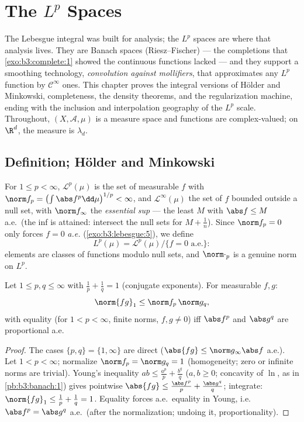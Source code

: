 \chapter{The \texorpdfstring{$L^p$}{Lp} Spaces}\label{ch:b3:lp}

The Lebesgue integral was built for analysis; the $L^p$ spaces
are where that analysis lives. They are Banach spaces
(Riesz--Fischer) --- the completions that
\cref{exo:b3:complete:1} showed the continuous functions
lacked --- and they support a smoothing technology,
\emph{convolution against mollifiers}, that approximates any
$L^p$ function by $\mathcal C^\infty$ ones. This chapter proves
the integral versions of H\"older and Minkowski, completeness,
the density theorems, and the regularization machine, ending
with the inclusion and interpolation geography of the $L^p$
scale. Throughout, $(X, \mathcal A, \mu)$ is a measure space
and functions are complex-valued; on $\R^d$, the measure is
$\lambda_d$.

\section{Definition; H\"older and Minkowski}

\begin{definition}\label{def:b3:lp:space}
For $1 \leq p < \infty$, $\mathcal L^p(\mu)$ is the set of
measurable $f$ with $\norm f_p = \bigl(\int\abs
f^p\dd\mu\bigr)^{1/p} < \infty$, and $\mathcal L^\infty(\mu)$
the set of $f$ bounded outside a null set, with $\norm
f_\infty$ the \emph{essential sup} --- the least $M$ with
$\abs f \leq M$ a.e.\ (the inf is attained: intersect the null
sets for $M + \frac1n$). Since $\norm f_p = 0$ only forces $f
= 0$ \emph{a.e.} (\cref{exo:b3:lebesgue:5}), we define
\[
L^p(\mu) = \mathcal L^p(\mu)/\{f = 0 \text{ a.e.}\} :
\]
elements are classes of functions modulo null sets, and
$\norm\cdot_p$ is a genuine norm on
$L^p$.
\end{definition}

\begin{theorem}\label{thm:b3:lp:holder}
Let $1 \leq p, q \leq \infty$ with $\frac1p + \frac1q = 1$
(conjugate exponents). For measurable $f, g$:
\[
\norm{fg}_1 \leq \norm f_p\,\norm g_q ,
\]
with equality (for $1 < p < \infty$, finite norms, $f,g\ne0$)
iff $\abs f^p$ and $\abs g^q$ are proportional a.e.
\end{theorem}

\begin{proof}
The cases $\{p, q\} = \{1, \infty\}$ are direct ($\abs{fg} \leq
\norm g_\infty\abs f$ a.e.). Let $1 < p < \infty$; normalize
$\norm f_p = \norm g_q = 1$ (homogeneity; zero or infinite
norms are trivial). Young's inequality $ab \leq \frac{a^p}p +
\frac{b^q}q$ ($a, b \geq 0$; concavity of $\ln$, as in
\cref{pb:b3:banach:1}) gives pointwise $\abs{f g} \leq
\frac{\abs f^p}p + \frac{\abs g^q}q$; integrate: $\norm{fg}_1
\leq \frac1p + \frac1q = 1$. Equality forces a.e.\ equality in
Young, i.e.\ $\abs f^p = \abs g^q$ a.e.\ (after the
normalization; undoing it, proportionality).
\end{proof}

